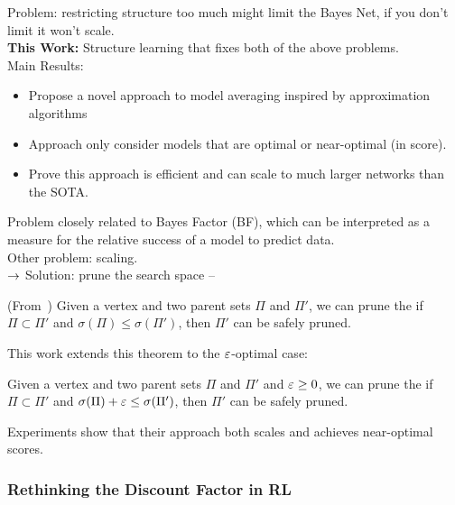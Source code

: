 Problem: restricting structure too much might limit the Bayes Net, if you don't limit it won't scale. \\

{\bf This Work:} Structure learning that fixes both of the above problems. \\

Main Results:
\begin{itemize}
    \item Propose a novel approach to model averaging inspired by approximation algorithms
    \item Approach only consider models that are optimal or near-optimal (in score).
    \item Prove this approach is efficient and can scale to much larger networks than the SOTA.
\end{itemize}


Problem closely related to Bayes Factor (BF), which can be interpreted as a measure for the relative success of a model to predict data. \\

Other problem: scaling. \\

$\rightarrow$ Solution: prune the search space --
\begin{theorem}
(From~\citet{teyssier2012ordering}) Given a vertex and two parent sets $\Pi$ and $\Pi'$, we can prune the if $\Pi \subset \Pi'$ and $\sigma(\Pi) \leq \sigma(\Pi')$, then $\Pi'$ can be safely pruned.
\end{theorem}

This work extends this theorem to the $\varepsilon$-optimal case:
\begin{theorem}
Given a vertex and two parent sets $\Pi$ and $\Pi'$ and $\varepsilon \geq 0$, we can prune the if $\Pi \subset \Pi'$ and $\sigma(\Pi) + \varepsilon \leq \sigma(\Pi')$, then $\Pi'$ can be safely pruned.
\end{theorem}

Experiments show that their approach both scales and achieves near-optimal scores.

\spacerule
\subsubsection{Rethinking the Discount Factor in RL~\cite{pitis2019rethinking}}

